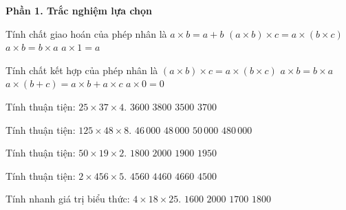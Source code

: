 \textbf{Phần 1. Trắc nghiệm lựa chọn}

\begin{ex} %
Tính chất giao hoán của phép nhân là
\choice
{$a \times b = a + b$}
{$(a \times b) \times c = a \times (b \times c)$}
{\True $a \times b = b \times a$}
{$a \times 1 = a$}
\end{ex}

\begin{ex} %
Tính chất kết hợp của phép nhân là
\choice
{\True $(a \times b) \times c = a \times (b \times c)$}
{$a \times b = b \times a$}
{$a \times (b + c) = a \times b + a \times c$}
{$a \times 0 = 0$}
\end{ex}

\begin{ex} %
Tính thuận tiện: $25 \times 37 \times 4$.
\choice
{$3600$}
{$3800$}
{$3500$}
{\True $3700$}
\end{ex}

\begin{ex} %
Tính thuận tiện: $125 \times 48 \times 8$.
\choice
{$46\,000$}
{\True $48\,000$}
{$50\,000$}
{$480\,000$}
\end{ex}

\begin{ex} %
Tính thuận tiện: $50 \times 19 \times 2$.
\choice
{$1800$}
{$2000$}
{\True $1900$}
{$1950$}
\end{ex}

\begin{ex} %
Tính thuận tiện: $2 \times 456 \times 5$.
\choice
{\True $4560$}
{$4460$}
{$4660$}
{$4500$}
\end{ex}

\begin{ex} %
Tính nhanh giá trị biểu thức: $4 \times 18 \times 25$.
\choice
{$1600$}
{$2000$}
{$1700$}
{\True $1800$}
\end{ex}

